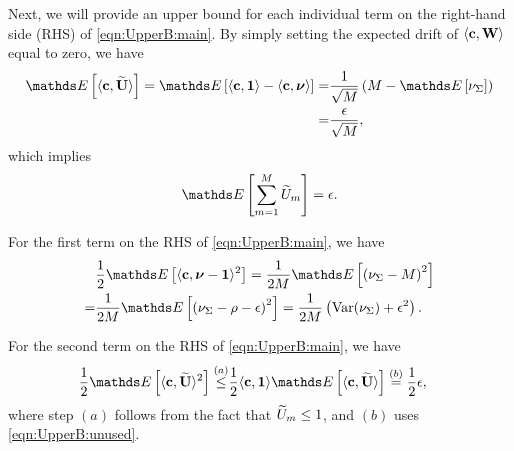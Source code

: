 \documentclass[10pt, conference, letterpaper]{IEEEtran} %
\begin{document}
Next, we will provide an upper bound for each individual term on the right-hand side (RHS) of \eqref{eqn:UpperB:main}. By simply setting the expected drift of $\langle\mathbf{c},\mathbf{W}\rangle$ equal to zero, we have 
\begin{align}
\label{eqn:UpperB:unused}
\bE\left[\langle\mb{c},\wt{\mb{U}}\rangle\right]=\bE\left[\langle\mb{c},\mb{1}\rangle-\langle\mb{c},\bs{\nu}\rangle\right]
=&\frac{1}{\sqrt{M}}\left(M-\bE\left[\nu_{\Sigma}\right]\right)\nonumber\\
=&\frac{\epsilon}{\sqrt{M}},
\end{align}
which implies 
\begin{align}
\label{eqn:UpperB:unused1}
\bE\left[\sum_{m=1}^{M}\wt{U}_m\right]=\epsilon.
\end{align}

For the first term on the RHS of \eqref{eqn:UpperB:main}, we have 
\begin{align}
\label{eqn:UpperB:first}
&\frac{1}{2}\bE\left[\langle\mb{c},\bs{\nu}-\mb{1}\rangle^2\right]=\frac{1}{2M}\bE\left[\left(\nu_{\Sigma}-M\right)^2\right] \nonumber\\
=&\frac{1}{2M}\bE\left[\left(\nu_{\Sigma}-\rho-\epsilon\right)^2\right]
=\frac{1}{2M}\left(\text{Var}(\nu_{\Sigma})+\epsilon^2\right).
\end{align}

For the second term on the RHS of \eqref{eqn:UpperB:main}, we have 
\begin{align}
\label{eqn:UpperB:second}
\frac{1}{2}\bE\left[\langle\mb{c},\wt{\mb{U}}\rangle^2\right]\stackrel{(a)}{\leq}&\frac{1}{2}\langle\mb{c},\mb{1}\rangle\bE\left[\langle\mb{c},\wt{\mb{U}}\rangle\right]\stackrel{(b)}{=}\frac{1}{2}\epsilon,
\end{align}
where step $(a)$ follows from the fact that $\widetilde{U}_m\leq1$, and $(b)$ uses \eqref{eqn:UpperB:unused}.
\end{document}
